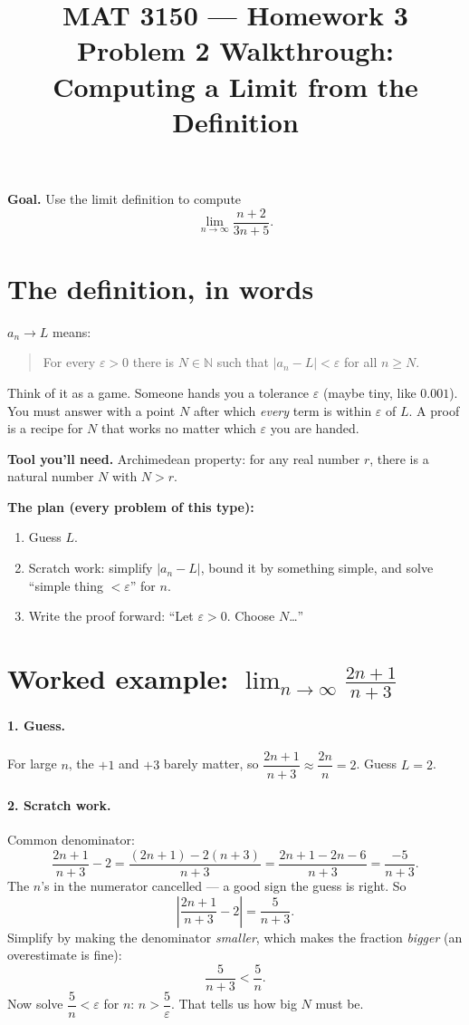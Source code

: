 \documentclass[11pt]{article}
\title{MAT 3150 --- Homework 3\\
\large Problem 2 Walkthrough: Computing a Limit from the Definition}
\author{}
\date{}
\begin{document}
\maketitle

\textbf{Goal.} Use the limit definition to compute
\[
  \lim_{n\to\infty}\frac{n+2}{3n+5}.
\]

\section*{The definition, in words}
$a_n \to L$ means:
\begin{quote}
For every $\varepsilon>0$ there is $N\in\mathbb{N}$ such that
$|a_n-L|<\varepsilon$ for all $n\ge N$.
\end{quote}
Think of it as a game. Someone hands you a tolerance $\varepsilon$
(maybe tiny, like $0.001$). You must answer with a point $N$ after which
\emph{every} term is within $\varepsilon$ of $L$. A proof is a recipe for
$N$ that works no matter which $\varepsilon$ you are handed.

\textbf{Tool you'll need.} Archimedean property: for any real number
$r$, there is a natural number $N$ with $N>r$.

\textbf{The plan (every problem of this type):}
\begin{enumerate}
  \item Guess $L$.
  \item Scratch work: simplify $|a_n-L|$, bound it by something simple,
        and solve ``simple thing $<\varepsilon$'' for $n$.
  \item Write the proof forward: ``Let $\varepsilon>0$. Choose $N$\ldots''
\end{enumerate}

\section*{Worked example: $\displaystyle\lim_{n\to\infty}\frac{2n+1}{n+3}$}

\paragraph{1. Guess.} For large $n$, the $+1$ and $+3$ barely matter, so
$\dfrac{2n+1}{n+3}\approx\dfrac{2n}{n}=2$. Guess $L=2$.

\paragraph{2. Scratch work.} Common denominator:
\[
  \frac{2n+1}{n+3}-2
  = \frac{(2n+1)-2(n+3)}{n+3}
  = \frac{2n+1-2n-6}{n+3}
  = \frac{-5}{n+3}.
\]
The $n$'s in the numerator cancelled --- a good sign the guess is right.
So
\[
  \left|\frac{2n+1}{n+3}-2\right| = \frac{5}{n+3}.
\]
Simplify by making the denominator \emph{smaller}, which makes the
fraction \emph{bigger} (an overestimate is fine):
\[
  \frac{5}{n+3} < \frac{5}{n}.
\]
Now solve $\dfrac{5}{n}<\varepsilon$ for $n$: \quad
$n>\dfrac{5}{\varepsilon}$. That tells us how big $N$ must be.
\end{document}
